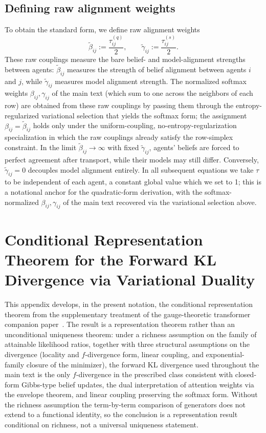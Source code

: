 \documentclass[11pt]{article}
\begin{document}
\subsection{Defining raw alignment weights}
To obtain the standard form, we define raw alignment weights
\begin{equation}
\tilde\beta_{ij}:=\frac{\tau^{(q)}_{ij}}{2},
\qquad
\tilde\gamma_{ij}:=\frac{\tau^{(s)}_{ij}}{2}.
\end{equation}
These raw couplings measure the bare belief- and model-alignment strengths between agents: $\tilde\beta_{ij}$ measures the strength of belief alignment between agents $i$ and $j$, while $\tilde\gamma_{ij}$ measures model alignment strength. The normalized softmax weights $\beta_{ij}, \gamma_{ij}$ of the main text (which sum to one across the neighbors of each row) are obtained from these raw couplings by passing them through the entropy-regularized variational selection that yields the softmax form; the assignment $\beta_{ij} = \tilde\beta_{ij}$ holds only under the uniform-coupling, no-entropy-regularization specialization in which the raw couplings already satisfy the row-simplex constraint. In the limit $\tilde\beta_{ij} \to \infty$ with fixed $\tilde\gamma_{ij}$, agents' beliefs are forced to perfect agreement after transport, while their models may still differ. Conversely, $\tilde\gamma_{ij} = 0$ decouples model alignment entirely. In all subsequent equations we take $\tau$ to be independent of each agent, a constant global value which we set to 1; this is a notational anchor for the quadratic-form derivation, with the softmax-normalized $\beta_{ij}, \gamma_{ij}$ of the main text recovered via the variational selection above.

\section*{Conditional Representation Theorem for the Forward KL Divergence via Variational Duality}
\label{app:conditional_representation}

This appendix develops, in the present notation, the conditional representation theorem from the supplementary treatment of the gauge-theoretic transformer companion paper~\cite{Dennis2025trans}. The result is a representation theorem rather than an unconditional uniqueness theorem: under a richness assumption on the family of attainable likelihood ratios, together with three structural assumptions on the divergence (locality and $f$-divergence form, linear coupling, and exponential-family closure of the minimizer), the forward KL divergence used throughout the main text is the only $f$-divergence in the prescribed class consistent with closed-form Gibbs-type belief updates, the dual interpretation of attention weights via the envelope theorem, and linear coupling preserving the softmax form. Without the richness assumption the term-by-term comparison of generators does not extend to a functional identity, so the conclusion is a representation result conditional on richness, not a universal uniqueness statement.
\end{document}
